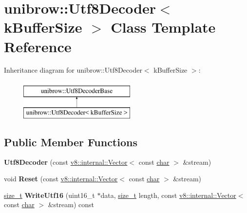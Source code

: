 \hypertarget{classunibrow_1_1Utf8Decoder}{}\section{unibrow\+:\+:Utf8\+Decoder$<$ k\+Buffer\+Size $>$ Class Template Reference}
\label{classunibrow_1_1Utf8Decoder}
Inheritance diagram for unibrow\+:\+:Utf8\+Decoder$<$ k\+Buffer\+Size $>$\+:\begin{figure}[H]
\begin{center}
\leavevmode
\includegraphics[height=2.000000cm]{classunibrow_1_1Utf8Decoder}
\end{center}
\end{figure}
\subsection*{Public Member Functions}
\begin{DoxyCompactItemize}
\item 
\mbox{\label{classunibrow_1_1Utf8Decoder_a2d66909ee7cf21cdd561dbea6a1df98c}} 
{\bfseries Utf8\+Decoder} (const \mbox{\hyperlink{classv8_1_1internal_1_1Vector}{v8\+::internal\+::\+Vector}}$<$ const \mbox{\hyperlink{classchar}{char}} $>$ \&stream)
\item 
\mbox{\label{classunibrow_1_1Utf8Decoder_a0a2bebc2180ebb58c5971b437a4fda3f}} 
void {\bfseries Reset} (const \mbox{\hyperlink{classv8_1_1internal_1_1Vector}{v8\+::internal\+::\+Vector}}$<$ const \mbox{\hyperlink{classchar}{char}} $>$ \&stream)
\item 
\mbox{\label{classunibrow_1_1Utf8Decoder_a5836832e8bb857137fa48a7340709773}} 
\mbox{\hyperlink{classsize__t}{size\+\_\+t}} {\bfseries Write\+Utf16} (uint16\+\_\+t $\ast$data, \mbox{\hyperlink{classsize__t}{size\+\_\+t}} length, const \mbox{\hyperlink{classv8_1_1internal_1_1Vector}{v8\+::internal\+::\+Vector}}$<$ const \mbox{\hyperlink{classchar}{char}} $>$ \&stream) const
\end{DoxyCompactItemize}
